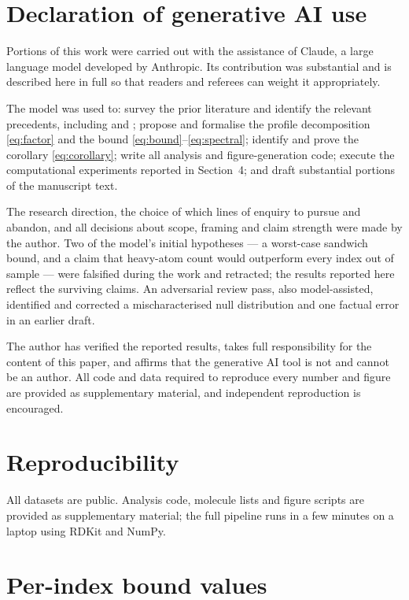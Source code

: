 \documentclass[11pt,a4paper]{article}
\theoremstyle{plain}
\begin{document}
\section*{Declaration of generative AI use}

Portions of this work were carried out with the assistance of Claude, a large language
model developed by Anthropic. Its contribution was substantial and is described here in
full so that readers and referees can weight it appropriately.

The model was used to: survey the prior literature and identify the relevant precedents,
including \citet{gutman2013} and \citet{randic1994}; propose and formalise the profile
decomposition \eqref{eq:factor} and the bound \eqref{eq:bound}--\eqref{eq:spectral};
identify and prove the corollary \eqref{eq:corollary}; write all analysis and figure-generation
code; execute the computational experiments reported in Section~4; and draft substantial
portions of the manuscript text.

The research direction, the choice of which lines of enquiry to pursue and abandon, and
all decisions about scope, framing and claim strength were made by the author. Two of the
model's initial hypotheses --- a worst-case sandwich bound, and a claim that heavy-atom
count would outperform every index out of sample --- were falsified during the work and
retracted; the results reported here reflect the surviving claims. An adversarial review
pass, also model-assisted, identified and corrected a mischaracterised null distribution
and one factual error in an earlier draft.

The author has verified the reported results, takes full responsibility for the content of
this paper, and affirms that the generative AI tool is not and cannot be an author. All
code and data required to reproduce every number and figure are provided as supplementary
material, and independent reproduction is encouraged.

\section*{Reproducibility}

All datasets are public. Analysis code, molecule lists and figure scripts are provided as
supplementary material; the full pipeline runs in a few minutes on a laptop using RDKit
and NumPy.

\appendix
\section{Per-index bound values}
\end{document}
